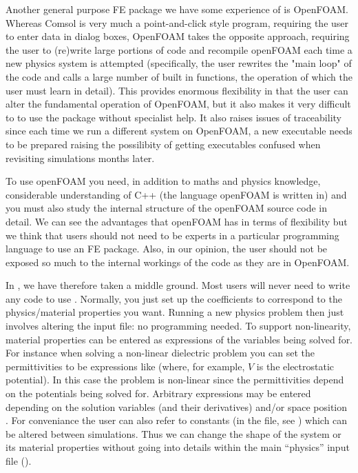 \documentclass[a4paper,twoside,11pt]{book}
\begin{document}
Another general purpose FE package we have some experience of is
OpenFOAM. Whereas Comsol is very much a point-and-click style program,
requiring the user to enter data in dialog boxes, OpenFOAM takes the
opposite approach, requiring the user to (re)write large portions of
code and recompile openFOAM each time a new physics system is
attempted (specifically, the user rewrites the "main loop" of the code
and calls a large number of built in functions, the operation of which
the user must learn in detail). This provides enormous flexibility in
that the user can alter the fundamental operation of OpenFOAM, but it
also makes it very difficult to to use the package without specialist
help. It also raises issues of traceability since each time we run a
different system on OpenFOAM, a new executable needs to be prepared
raising the possilibity of getting executables confused when
revisiting simulations months later.

To use openFOAM you need, in addition to maths and physics knowledge,
considerable understanding of C++ (the language openFOAM is written
in) and you must also study the internal structure of the openFOAM
source code in detail. We can see the advantages that openFOAM has in
terms of flexibility but we think that users should not need to be
experts in a particular programming language to use an FE
package. Also, in our opinion, the user should not be exposed so much
to the internal workings of the code as they are in OpenFOAM.

In \zinc, we have therefore taken a middle ground. Most users will
never need to write any code to use \zinc. Normally, you just set up the
coefficients to correspond to the physics/material properties you
want. Running a new physics problem then just involves altering the input
file: no programming needed. To support non-linearity, material
properties can be entered as expressions of the variables being solved
for. For instance when solving a non-linear dielectric problem you can set
the permittivities to be expressions like
 (where, for example, $V$ is the electrostatic
potential). In this case the problem is non-linear since
the permittivities depend on the potentials being solved
for. Arbitrary expressions may be entered depending on the solution
variables (and their derivatives) and/or space position
. For conveniance the user can also refer to constants
(in the  file, see ) which can be altered between
simulations. Thus we can change the shape of the system or its
material properties without going into details within the main
``physics'' input file ().
\end{document}

